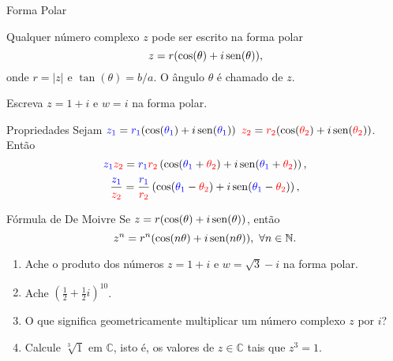 \begin{frame}{Forma Polar}

Qualquer número complexo $z$ pode ser escrito na {\color{blue} forma polar}
\[z=r(\cos(\theta)+i\operatorname{sen}(\theta)),\]
onde $r=|z|$ e $\tan(\theta)=b/a$. O ângulo $\theta$ é chamado  de $z$.

\begin{exe}
Escreva $z=1+i$ e $w=i$ na forma polar.
\end{exe}


\end{frame}

\begin{frame}{Propriedades}
Sejam ${\color{blue}z_1}={\color{blue}r_1}(\cos({\color{blue}\theta_1})
+i\operatorname{sen}({\color{blue}\theta_1}))$ ${\color{red}z_2}={\color{red}r_2}(\cos({\color{red}\theta_2})
+i\operatorname{sen}({\color{red}\theta_2}))$. Então
\[{\color{blue}z_1}{\color{red}z_2}={\color{blue}r_1}{\color{red}r_2}
\left(\cos({\color{blue}\theta_1}+{\color{red}\theta_2})
+i\operatorname{sen}({\color{blue}\theta_1}+{\color{red}\theta_2})\right),\]
\[\frac{{\color{blue}z_1}}{{\color{red}z_2}}
=\frac{{\color{blue}r_1}}{{\color{red}r_2}}
\left(\cos({\color{blue}\theta_1}-{\color{red}\theta_2})
+i\operatorname{sen}({\color{blue}\theta_1}-{\color{red}\theta_2})\right),\]
\begin{block}{Fórmula de De Moivre}
Se $z=r(\cos(\theta)+i\operatorname{sen}(\theta))$, então
\[z^n=r^n(\cos(n\theta)+i\sen(n\theta)), \ \forall n\in \mathbb{N}.\]
\end{block}
\end{frame}


\begin{frame}
\begin{exe}
\begin{enumerate}
\item Ache o produto dos números $z=1+i$ e $w=\sqrt{3}-i$ na forma polar.

\item Ache $\left(\frac{1}{2}+\frac{1}{2}i\right)^{10}$.

\item O que significa geometricamente multiplicar um número complexo $z$ por $i$?

\item Calcule $\sqrt[3]{1}$ em  $\mathbb{C}$, isto é, os valores de $z\in \mathbb{C}$ tais que $z^3=1$.
\end{enumerate}
\end{exe}
\end{frame}